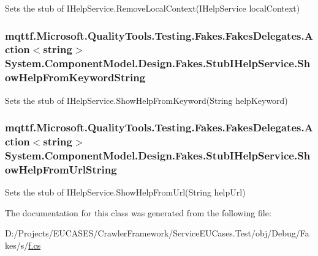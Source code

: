 Sets the stub of I\-Help\-Service.\-Remove\-Local\-Context(\-I\-Help\-Service local\-Context)

\hypertarget{class_system_1_1_component_model_1_1_design_1_1_fakes_1_1_stub_i_help_service_adba2c3637062bb9460b4b2c2b078417c}{
\subsubsection[{Show\-Help\-From\-Keyword\-String}]{\setlength{\rightskip}{0pt plus 5cm}mqttf.\-Microsoft.\-Quality\-Tools.\-Testing.\-Fakes.\-Fakes\-Delegates.\-Action$<$string$>$ System.\-Component\-Model.\-Design.\-Fakes.\-Stub\-I\-Help\-Service.\-Show\-Help\-From\-Keyword\-String}}\label{class_system_1_1_component_model_1_1_design_1_1_fakes_1_1_stub_i_help_service_adba2c3637062bb9460b4b2c2b078417c}


Sets the stub of I\-Help\-Service.\-Show\-Help\-From\-Keyword(\-String help\-Keyword)

\hypertarget{class_system_1_1_component_model_1_1_design_1_1_fakes_1_1_stub_i_help_service_a4c15e8999d72069a48404c0c2e380b0f}{
\subsubsection[{Show\-Help\-From\-Url\-String}]{\setlength{\rightskip}{0pt plus 5cm}mqttf.\-Microsoft.\-Quality\-Tools.\-Testing.\-Fakes.\-Fakes\-Delegates.\-Action$<$string$>$ System.\-Component\-Model.\-Design.\-Fakes.\-Stub\-I\-Help\-Service.\-Show\-Help\-From\-Url\-String}}\label{class_system_1_1_component_model_1_1_design_1_1_fakes_1_1_stub_i_help_service_a4c15e8999d72069a48404c0c2e380b0f}


Sets the stub of I\-Help\-Service.\-Show\-Help\-From\-Url(\-String help\-Url)



The documentation for this class was generated from the following file\-:\begin{DoxyCompactItemize}
\item 
D\-:/\-Projects/\-E\-U\-C\-A\-S\-E\-S/\-Crawler\-Framework/\-Service\-E\-U\-Cases.\-Test/obj/\-Debug/\-Fakes/s/\hyperlink{s_2f_8cs}{f.\-cs}\end{DoxyCompactItemize}
